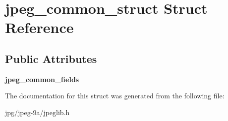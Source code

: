 \hypertarget{structjpeg__common__struct}{\section{jpeg\+\_\+common\+\_\+struct Struct Reference}
\label{structjpeg__common__struct}
}
\subsection*{Public Attributes}
\begin{DoxyCompactItemize}
\item 
\hypertarget{structjpeg__common__struct_af0328603f836658f65d39679f6bbfa7a}{{\bfseries jpeg\+\_\+common\+\_\+fields}}\label{structjpeg__common__struct_af0328603f836658f65d39679f6bbfa7a}

\end{DoxyCompactItemize}


The documentation for this struct was generated from the following file\+:\begin{DoxyCompactItemize}
\item 
jpg/jpeg-\/9a/jpeglib.\+h\end{DoxyCompactItemize}
